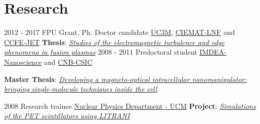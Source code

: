 \documentclass[letterpaper]{twentysecondcv} %
\begin{document}
\section{Research}
\begin{twenty}
	\twentyitem
    	{2012 - 2017}
		{}
        {FPU Grant, Ph. Doctor candidate}
        {\href{https://www.uc3m.es/}{UC3M},  \href{http://www.ciemat.es/}{CIEMAT-LNF} and \href{https://www.euro-fusion.org/devices/jet/}{CCFE-JET}}
        {}
        {
       	\textbf{Thesis}: \href{https://e-archivo.uc3m.es/handle/10016/24978}{\emph{Studies of the electromagnetic turbulence and edge phenomena in fusion plasmas}}
        }
    \twentyitem
        {2008 - 2011}
        {}
        {Predoctoral student}
        {\href{http://nanociencia.imdea.org/}{IMDEA-Nanoscience} and \href{http://www.cnb.csic.es/index.php/es/investigacion/departamentos-de-investigacion/estructura-de-macromoleculas}{CNB-CSIC}}
        {}
        {
        \textbf{Master Thesis}: \href{https://drive.google.com/open?id=1oGQjBpotnNVcit9QcrBaTAIsPuv4H9pz}{\emph{Developing a magneto-optical intracellular nanomanipulator: bringing single-molecule techniques inside the cell}}
        \vspace{2mm}

        }
    \twentyitem
        {2008}
        {}
        {Research trainee}
        {\href{http://nuclear.fis.ucm.es/}{Nuclear Physics Department - UCM}}
        {}
        {
        \textbf{Project}: \href{https://drive.google.com/open?id=1hC6z1AJrOAY0hH-OgYCG0hBnCQOkAaPH}{\emph{Simulations of the PET scintillators using LITRANI}}
        }
\end{twenty}

\end{document}
